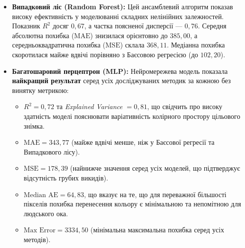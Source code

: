 \begin{itemize}
	\item \textbf{Випадковий ліс (Random Forest):} Цей ансамблевий алгоритм
		показав високу ефективність у моделюванні складних нелінійних залежностей. Показник
		$R^{2}$ досяг $0,67$, а частка поясненої дисперсії — $0,76$. Середня абсолютна
		похибка ($\text{MAE}$) знизилася орієнтовно до $385,00$, а
		середньоквадратична похибка ($\text{MSE}$) склала $368,11$. Медіанна похибка
		скоротилася майже вдвічі порівняно з Баєсовою регресією (до $102,20$).

	\item \textbf{Багатошаровий перцептрон (MLP):} Нейромережева модель показала
		\textbf{найкращий результат} серед усіх досліджуваних методик за кожною без винятку
		метрикою:
		\begin{itemize}
			\item $R^{2}= 0,72$ та \textit{Explained Variance} $= 0,81$, що свідчить про
				високу здатність моделі пояснювати варіативність колірного простору цільового
				знімка.

			\item $\text{MAE}= 343,77$ (майже вдвічі менше, ніж у Баєсової регресії та
				Випадкового лісу).

			\item $\text{MSE}= 178,39$ (найнижче значення серед усіх моделей, що підтверджує
				відсутність грубих викидів).

			\item $\text{Median AE}= 64,83$, що вказує на те, що для переважної більшості
				пікселів похибка перенесення кольору є мінімальною та непомітною для людського
				ока.

			\item $\text{Max Error}= 3334,50$ (мінімальна максимальна похибка серед
				усіх методів).
		\end{itemize}
\end{itemize}

